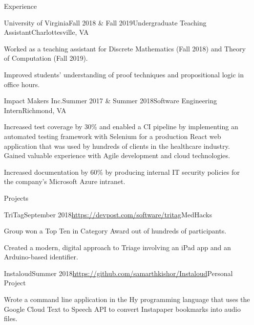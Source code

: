 \documentclass{resume}
\begin{document}
\begin{rSection}{Experience}
  \begin{rSubsection}{University of Virginia}{Fall 2018 \& Fall 2019}{Undergraduate Teaching Assistant}{Charlottesville, VA}
    \item Worked as a teaching assistant for Discrete Mathematics (Fall 2018) and Theory of Computation (Fall 2019).
    \item Improved students' understanding of proof techniques and propositional logic in office hours.
  \end{rSubsection}

  \begin{rSubsection}{Impact Makers Inc.}{Summer 2017 \& Summer 2018}{Software Engineering Intern}{Richmond, VA}
    \item Increased test coverage by 30\% and enabled a CI pipeline by implementing an automated testing framework with Selenium for a production React web application that was used by hundreds of clients in the healthcare industry.  Gained valuable experience with Agile development and cloud technologies.
    \item Increased documentation by 60\% by producing internal IT security policies for the company's Microsoft Azure intranet.
  \end{rSubsection}

\end{rSection}

\begin{rSection}{Projects}

  \begin{rSubsection}{TriTag}{September 2018}{\url{https://devpost.com/software/tritag}}{MedHacks}
    \item Group won a Top Ten in Category Award out of hundreds of participants.
    \item Created a modern, digital approach to Triage involving an iPad app and an Arduino-based identifier.
  \end{rSubsection}

  \begin{rSubsection}{Instaloud}{Summer 2018}{\url{https://github.com/samarthkishor/Instaloud}}{Personal Project}
    \item Wrote a command line application in the Hy programming language that uses the Google Cloud Text to Speech API to convert Instapaper bookmarks into audio files.
  \end{rSubsection}

\end{rSection}
\end{document}
